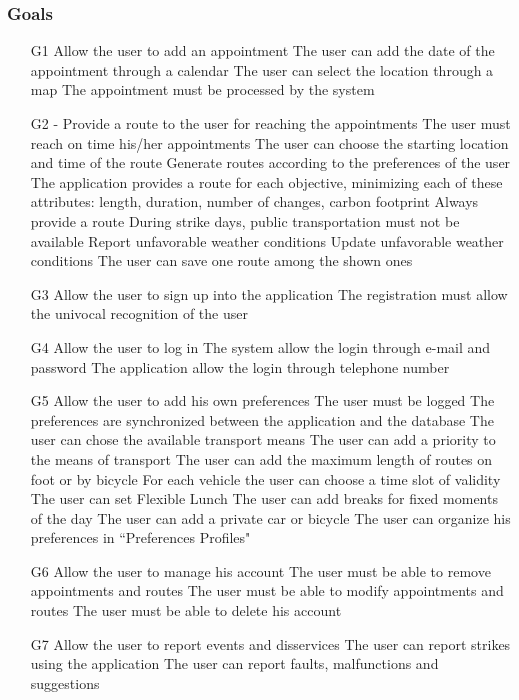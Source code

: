 \subsubsection{Goals}
\begin{itemize}
	\item[G1] Allow the user to add an appointment
	\subitem[G1.1] The user can add the date of the appointment through a calendar
	\subitem[G1.2] The user can select the location through a map
	\subitem[G1.3] The appointment must be processed by the system
	\item[G2] - Provide a route to the user for reaching the appointments
	\subitem[G2.1] The user must reach on time his/her appointments
	\subitem[G2.2] The user can choose the starting location and time of the route
	\subitem[G2.3] Generate routes according to the preferences of the user
	\subitem[G2.4] The application provides a route for each objective, minimizing each of these attributes: length, duration, number of changes, carbon footprint
	\subitem[G2.5] Always provide a route
	\subitem[G2.6] During strike days, public transportation must not be available
	\subitem[G2.7] Report unfavorable weather conditions
	\subitem[G2.8] Update unfavorable weather conditions
	\subitem[G2.9] The user can save one route among the shown ones
	\item[G3] Allow the user to sign up into the application
	\subitem[G3.1] The registration must allow the univocal recognition of the user
	\item[G4] Allow the user to log in
	\subitem[G4.1] The system allow the login through e-mail and password
	\subitem[G4.2] The application allow the login through telephone number
	\item[G5] Allow the user to add his own preferences
	\subitem[G5.1] The user must be logged
	\subitem[G5.2] The preferences are synchronized between the application and the database
	\subitem[G5.3] The user can chose the available transport means
	\subitem[G5.4] The user can add a priority to the means of transport
	\subitem[G5.5] The user can add the maximum length of routes on foot or by bicycle
	\subitem[G5.6] For each vehicle the user can choose a time slot of validity
	\subitem[G5.7] The user can set Flexible Lunch
	\subitem[G5.8] The user can add breaks for fixed moments of the day
	\subitem[G5.9] The user can add a private car or bicycle
	\subitem[G5.10] The user can organize his preferences in “Preferences Profiles"
	\item[G6] Allow the user to manage his account
	\subitem[G6.1] The user must be able to remove appointments and routes
	\subitem[G6.2] The user must be able to modify appointments and routes
	\subitem[G6.3] The user must be able to delete his account
	\item[G7] Allow the user to report events and disservices 
	\subitem[G7.1] The user can report strikes using the application
	\subitem[G7.2] The user can report faults, malfunctions and suggestions
\end{itemize}

